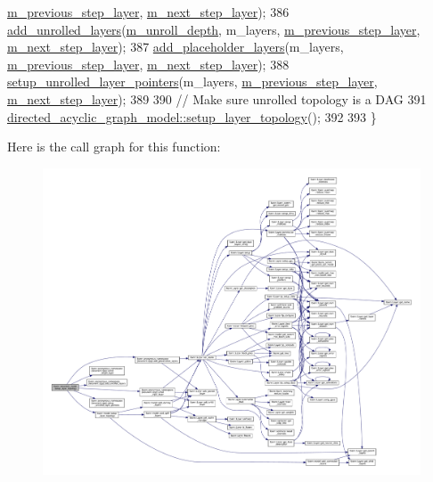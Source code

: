 \begin{DoxyCode}
      \hyperlink{classlbann_1_1recurrent__model_ac728773d3de0cefb9390231dc176dca4}{m\_previous\_step\_layer}, \hyperlink{classlbann_1_1recurrent__model_a426829f7fa36b112b4b91393c1657ddd}{m\_next\_step\_layer});
386   \hyperlink{namespacelbann_1_1anonymous__namespace_02recurrent_8cpp_03_a16733e1fb301c3099a5fe07d703c3782}{add\_unrolled\_layers}(\hyperlink{classlbann_1_1recurrent__model_a71eb93ebf3411a5c170f6570c93e3cca}{m\_unroll\_depth}, m\_layers, 
      \hyperlink{classlbann_1_1recurrent__model_ac728773d3de0cefb9390231dc176dca4}{m\_previous\_step\_layer}, \hyperlink{classlbann_1_1recurrent__model_a426829f7fa36b112b4b91393c1657ddd}{m\_next\_step\_layer});
387   \hyperlink{namespacelbann_1_1anonymous__namespace_02recurrent_8cpp_03_a50bca1c07c6f3146947b2a0fb5cc815a}{add\_placeholder\_layers}(m\_layers, \hyperlink{classlbann_1_1recurrent__model_ac728773d3de0cefb9390231dc176dca4}{m\_previous\_step\_layer}, 
      \hyperlink{classlbann_1_1recurrent__model_a426829f7fa36b112b4b91393c1657ddd}{m\_next\_step\_layer});
388   \hyperlink{namespacelbann_1_1anonymous__namespace_02recurrent_8cpp_03_a12a6f96a1c15c91218169bf7157cd800}{setup\_unrolled\_layer\_pointers}(m\_layers, 
      \hyperlink{classlbann_1_1recurrent__model_ac728773d3de0cefb9390231dc176dca4}{m\_previous\_step\_layer}, \hyperlink{classlbann_1_1recurrent__model_a426829f7fa36b112b4b91393c1657ddd}{m\_next\_step\_layer});
389 
390   \textcolor{comment}{// Make sure unrolled topology is a DAG}
391   \hyperlink{classlbann_1_1model_a7b3e2a643c658dcaa7478d2568f29784}{directed\_acyclic\_graph\_model::setup\_layer\_topology}();
392   
393 \}
\end{DoxyCode}
Here is the call graph for this function\+:\nopagebreak
\begin{figure}[H]
\begin{center}
\leavevmode
\includegraphics[width=350pt]{classlbann_1_1recurrent__model_ac89ddfa607e5cb6b940eb389ebbce6f6_cgraph}
\end{center}
\end{figure}
